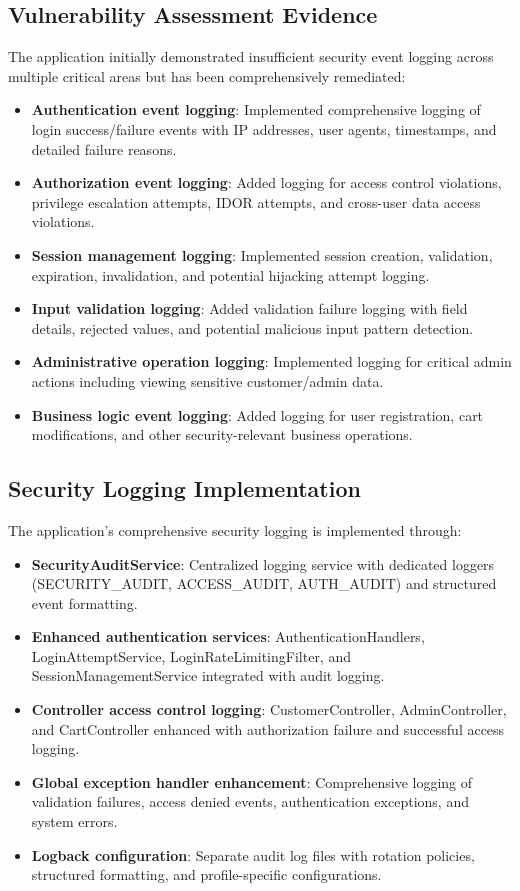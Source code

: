 \documentclass[]{UCD_CS_FYP_Report}
\begin{document}
\subsection{Vulnerability Assessment Evidence}
The application initially demonstrated insufficient security event logging across multiple critical areas but has been comprehensively remediated:
\begin{itemize}
	\item \textbf{Authentication event logging}: Implemented comprehensive logging of login success/failure events with IP addresses, user agents, timestamps, and detailed failure reasons.
	\item \textbf{Authorization event logging}: Added logging for access control violations, privilege escalation attempts, IDOR attempts, and cross-user data access violations.
	\item \textbf{Session management logging}: Implemented session creation, validation, expiration, invalidation, and potential hijacking attempt logging.
	\item \textbf{Input validation logging}: Added validation failure logging with field details, rejected values, and potential malicious input pattern detection.
	\item \textbf{Administrative operation logging}: Implemented logging for critical admin actions including viewing sensitive customer/admin data.
	\item \textbf{Business logic event logging}: Added logging for user registration, cart modifications, and other security-relevant business operations.
\end{itemize}

\subsection{Security Logging Implementation}
The application's comprehensive security logging is implemented through:
\begin{itemize}
	\item \textbf{SecurityAuditService}: Centralized logging service with dedicated loggers (SECURITY\_AUDIT, ACCESS\_AUDIT, AUTH\_AUDIT) and structured event formatting.
	\item \textbf{Enhanced authentication services}: AuthenticationHandlers, LoginAttemptService, LoginRateLimitingFilter, and SessionManagementService integrated with audit logging.
	\item \textbf{Controller access control logging}: CustomerController, AdminController, and CartController enhanced with authorization failure and successful access logging.
	\item \textbf{Global exception handler enhancement}: Comprehensive logging of validation failures, access denied events, authentication exceptions, and system errors.
	\item \textbf{Logback configuration}: Separate audit log files with rotation policies, structured formatting, and profile-specific configurations.
\end{itemize}
\end{document}
